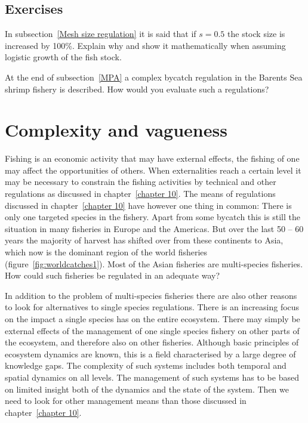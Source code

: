 \documentclass[11pt,fleqn]{book} %
\begin{document}
\section*{Exercises}

\begin{exercise}
In subsection~\ref{Mesh size regulation} it is said that if $s = 0.5$ the stock size is increased by 100\%. Explain why and show it mathematically when assuming logistic growth of the fish stock.
\end{exercise}
\begin{exercise}
At the end of subsection~\ref{MPA} a complex bycatch regulation in the Barents Sea shrimp fishery is described. How would you evaluate such a regulations?
\end{exercise}

\chapter{Complexity and vagueness} \label{chapter 11}

Fishing is an economic activity that may have external effects, the fishing of one may affect the opportunities of others. When externalities reach a certain level it may be necessary to constrain the fishing activities by technical and other regulations as discussed in chapter~\ref{chapter 10}. The means of regulations discussed in chapter~\ref{chapter 10} have however one thing in common: There is only one targeted species in the fishery. Apart from some bycatch this is still the situation in many fisheries in Europe and the Americas. But over the last 50 -- 60 years the majority of harvest has shifted over from these continents to Asia, which now is the dominant region of the world fisheries (figure~\ref{fig:worldcatches1}). Most of the Asian fisheries are multi-species fisheries. How could such fisheries be regulated in an adequate way?

In addition to the problem of multi-species fisheries there are also other reasons to look for alternatives to single species regulations. There is an increasing focus on the impact a single species has on the entire ecosystem. There may simply be external effects of the management of one single species fishery on other parts of the ecosystem, and therefore also on other fisheries. Although basic principles of ecosystem dynamics are known, this is a field characterised by a large degree of knowledge gaps. The complexity of such systems includes both temporal and spatial dynamics on all levels. The management of such systems has to be based on limited insight both of the dynamics and the state of the system. Then we need to look for other management means than those discussed in chapter~\ref{chapter 10}.
\end{document}
